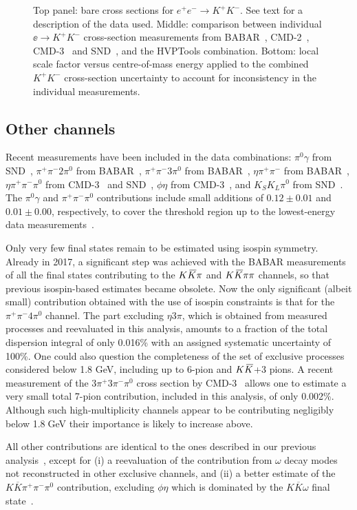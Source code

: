 \begin{figure}[p]
\caption[.]{ 
            Top panel: bare cross sections for  $e^+e^-\to K^+ K^-  $. See text for a description of the data used. 
            Middle: comparison between individual $\ee\to K^+K^-$ cross-section measurements from BABAR~\cite{babar-kpkm}, CMD-2~\cite{Akhmetshin:2008gz}, CMD-3~\cite{Kozyrev:2017agm} and SND~\cite{snd-kpkm}, and the HVPTools combination.  
            Bottom: local scale factor versus centre-of-mass energy applied 
            to the combined $K^+K^-$ cross-section uncertainty to account for inconsistency 
            in the individual measurements. }
\label{fig:kkweights}
\end{figure}


\subsection{Other channels}

Recent measurements have been included in the data combinations: $\pi^0 \gamma$ from SND~\cite{Achasov:2018ujw}, $\pi^+\pi^-2\pi^0$ from BABAR~\cite{TheBaBar:2017vzo},  $\pi^+\pi^-3\pi^0$ from BABAR~\cite{Lees:2018dnv}, $\eta\pi^+\pi^-$ from BABAR~\cite{TheBABAR:2018vvb}, $\eta\pi^+\pi^-\pi^0$ from CMD-3~\cite{CMD-3:2017tgb} and SND~\cite{Achasov:2019duv}, $\phi\eta$ from CMD-3~\cite{Ivanov:2019crp}, and $K_SK_L\pi^0$ from SND~\cite{Achasov:2017vaq}.
The  $\pi^0 \gamma$ and $\pi^+\pi^-\pi^0$ contributions include small additions of $0.12\pm 0.01$ and $0.01\pm 0.00$, respectively, to cover the threshold region up to the lowest-energy data measurements~\cite{hmnt03,knt19}.

Only very few final states remain to be estimated using isospin symmetry. Already in 2017, a significant step was achieved with the BABAR measurements of all the final states contributing to the $K \kern 0.2em\overline{\kern -0.2em K}{} \pi$ and $K \kern 0.2em\overline{\kern -0.2em K}{} \pi\pi$ channels, so that previous isospin-based estimates became obsolete. Now the only significant (albeit small) contribution obtained with the use of isospin constraints is that for the $\pi^+\pi^-4\pi^0$ channel. The part excluding $\eta 3\pi$, which is obtained from measured processes and reevaluated in this analysis, amounts to a fraction of the total dispersion integral of only 0.016\% with an assigned systematic uncertainty of 100\%. One could also question the completeness of the set of exclusive processes considered below 1.8 GeV, including up to 6-pion and 
$K \kern 0.2em\overline{\kern -0.2em K}{}$+3 pions. A recent measurement of the $3\pi^+ 3\pi^- \pi^0$ cross section by CMD-3~\cite{cmd3-7pi} allows one to estimate a very small total 7-pion contribution, included in this analysis, of only 0.002\%. Although such high-multiplicity channels appear to be contributing negligibly below 1.8$\;$GeV their importance is likely to increase above.

All other contributions are identical to the ones described in our previous analysis~\cite{dhmz2017}, except for (i) a reevaluation of the contribution from $\omega$ decay modes not reconstructed in other exclusive channels, and (ii) a better estimate of the $K \overline{K} \pi^+ \pi^- \pi^0$ contribution, excluding $\phi\eta$ which is dominated by the $K \overline{K} \omega$ final state~\cite{Aubert:2007ef}.
